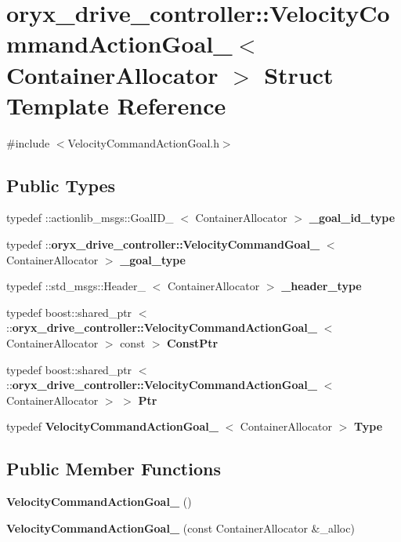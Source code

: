 \section{oryx\-\_\-drive\-\_\-controller\-:\-:\-Velocity\-Command\-Action\-Goal\-\_\-$<$ \-Container\-Allocator $>$ \-Struct \-Template \-Reference}
\label{structoryx__drive__controller_1_1VelocityCommandActionGoal__}


{\ttfamily \#include $<$\-Velocity\-Command\-Action\-Goal.\-h$>$}

\subsection*{\-Public \-Types}
\begin{DoxyCompactItemize}
\item 
typedef \*
\-::actionlib\-\_\-msgs\-::\-Goal\-I\-D\-\_\-\*
$<$ \-Container\-Allocator $>$ {\bf \-\_\-goal\-\_\-id\-\_\-type}
\item 
typedef \*
\-::{\bf oryx\-\_\-drive\-\_\-controller\-::\-Velocity\-Command\-Goal\-\_\-}\*
$<$ \-Container\-Allocator $>$ {\bf \-\_\-goal\-\_\-type}
\item 
typedef \-::std\-\_\-msgs\-::\-Header\-\_\-\*
$<$ \-Container\-Allocator $>$ {\bf \-\_\-header\-\_\-type}
\item 
typedef boost\-::shared\-\_\-ptr\*
$<$ \-::{\bf oryx\-\_\-drive\-\_\-controller\-::\-Velocity\-Command\-Action\-Goal\-\_\-}\*
$<$ \-Container\-Allocator $>$ const  $>$ {\bf \-Const\-Ptr}
\item 
typedef boost\-::shared\-\_\-ptr\*
$<$ \-::{\bf oryx\-\_\-drive\-\_\-controller\-::\-Velocity\-Command\-Action\-Goal\-\_\-}\*
$<$ \-Container\-Allocator $>$ $>$ {\bf \-Ptr}
\item 
typedef \*
{\bf \-Velocity\-Command\-Action\-Goal\-\_\-}\*
$<$ \-Container\-Allocator $>$ {\bf \-Type}
\end{DoxyCompactItemize}
\subsection*{\-Public \-Member \-Functions}
\begin{DoxyCompactItemize}
\item 
{\bf \-Velocity\-Command\-Action\-Goal\-\_\-} ()
\item 
{\bf \-Velocity\-Command\-Action\-Goal\-\_\-} (const \-Container\-Allocator \&\-\_\-alloc)
\end{DoxyCompactItemize}
